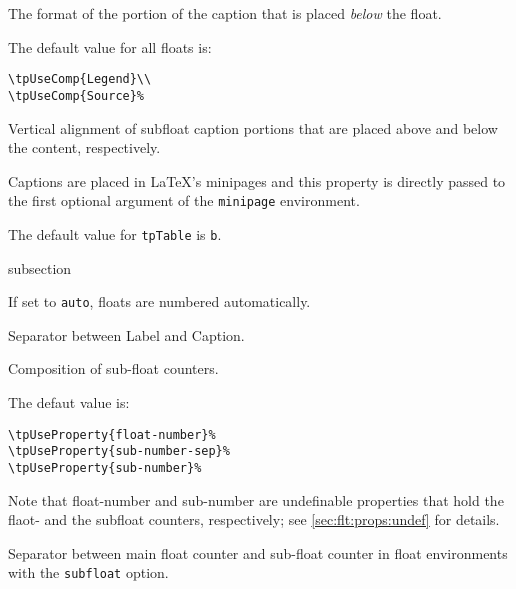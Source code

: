 
The format of the portion of the caption that is placed \textit{below}
the float.

The default value for all floats is:
\begin{lstlisting}[style=tex]
\tpUseComp{Legend}\\
\tpUseComp{Source}%
\end{lstlisting}


Vertical alignment of subfloat caption portions that are placed above
and below the content, respectively.

Captions are placed in \LaTeX's minipages and this property is directly
passed to the first optional argument of the \lstinline{minipage}
environment.

The default value for \lstinline{tpTable} is \lstinline{b}.


\begin{heading}[label=sec:flt:numbering]{subsection}
\end{heading}


If set to \lstinline{auto}, floats are numbered automatically.


Separator between Label and Caption.


Composition of sub-float counters.

The defaut value is:
\begin{lstlisting}[style=tex]
\tpUseProperty{float-number}%
\tpUseProperty{sub-number-sep}%
\tpUseProperty{sub-number}%
\end{lstlisting}
Note that float-number and sub-number are undefinable properties that hold the flaot- and the subfloat counters, respectively; see \autoref{sec:flt:props:undef} for details.


Separator between main float counter and sub-float counter in float
environments with the \lstinline{subfloat} option.

